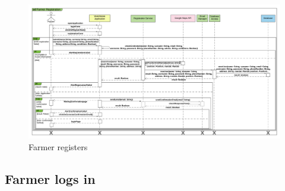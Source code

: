 \newpage
\begin{landscape}
\begin{figure}[h]
\vspace*{-2cm}
\noindent
\centering
\centerline{\includegraphics[scale= 0.108]{./Images/Sequence diagram/Farmer Registration Sequence Diagram.png}}
    \caption{Farmer registers}
    \vspace*{-12cm}
\end{figure}
\fillandplacepagenumber
\end{landscape}

\subsection{Farmer logs in}

